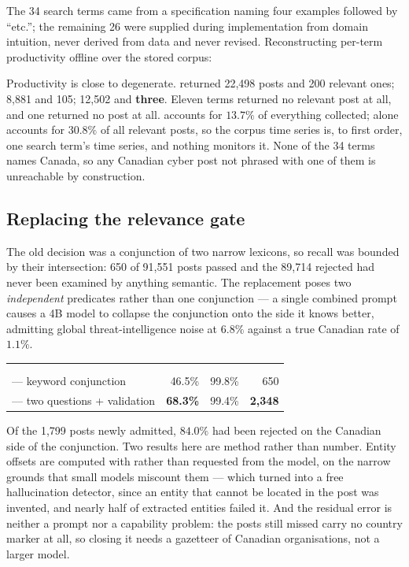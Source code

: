 \documentclass[11pt]{article}
\begin{document}
The 34 search terms came from a specification naming four examples followed by
``etc.''; the remaining 26 were supplied during implementation from domain
intuition, never derived from data and never revised. Reconstructing per-term
productivity offline over the stored corpus:

Productivity is close to degenerate.  returned 22{,}498
posts and 200 relevant ones;  8{,}881 and 105; 
12{,}502 and \textbf{three}. Eleven terms returned no relevant post at all, and
one returned no post at all.  accounts for $13.7\%$ of everything
collected;  alone accounts for $30.8\%$ of all relevant
posts, so the corpus time series is, to first order, one search term's
time series, and nothing monitors it. None of the 34 terms names Canada, so
any Canadian cyber post not phrased with one of them is unreachable by
construction.

\subsection*{Replacing the relevance gate}

The old decision was a conjunction of two narrow lexicons, so recall was
bounded by their intersection: 650 of 91{,}551 posts passed and the 89{,}714
rejected had never been examined by anything semantic. The replacement poses
two \emph{independent} predicates rather than one conjunction --- a single
combined prompt causes a 4B model to collapse the conjunction onto the side it
knows better, admitting global threat-intelligence noise at $6.8\%$ against a
true Canadian rate of $1.1\%$.

\begin{center}\small
\begin{tabularx}{.93\linewidth}{@{}Lrrr@{}}
\toprule
{} &  &  &  \\
 &  &  &  \\
\midrule
{} --- keyword conjunction     & 46.5\% & 99.8\% & 650 \\
 --- two questions + validation & \textbf{68.3\%} & 99.4\% & \textbf{2{,}348} \\
\bottomrule
\end{tabularx}
\end{center}

Of the 1{,}799 posts newly admitted, $84.0\%$ had been rejected on the Canadian
side of the conjunction. Two results here are method rather than number. Entity
offsets are computed with  rather than requested from the model,
on the narrow grounds that small models miscount them --- which turned into a
free hallucination detector, since an entity that cannot be located in the post
was invented, and nearly half of extracted  entities failed it. And
the residual error is neither a prompt nor a capability problem: the posts still
missed carry no country marker at all, so closing it needs a gazetteer of
Canadian organisations, not a larger model.
\end{document}
